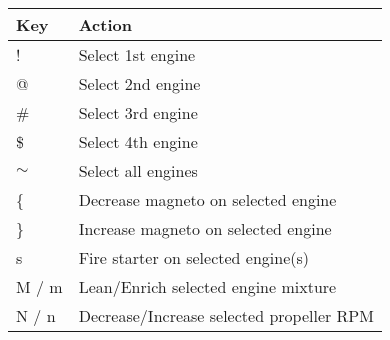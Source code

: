 \begin{tabular}{|l|l|}\hline
Key      &  Action\\ \hline
   !     & Select 1st engine\\
   @	   & Select 2nd engine\\
  \#     & Select 3rd engine\\
  \$     & Select 4th engine\\
  $\sim$ & Select all engines\\\hline
  \{     & Decrease magneto on selected engine\\
  \}     & Increase magneto on selected engine\\
   s     & Fire starter on selected engine(s)\\
  M / m  & Lean/Enrich selected engine mixture\\
  N / n  & Decrease/Increase selected propeller RPM\\\hline
\end{tabular}

